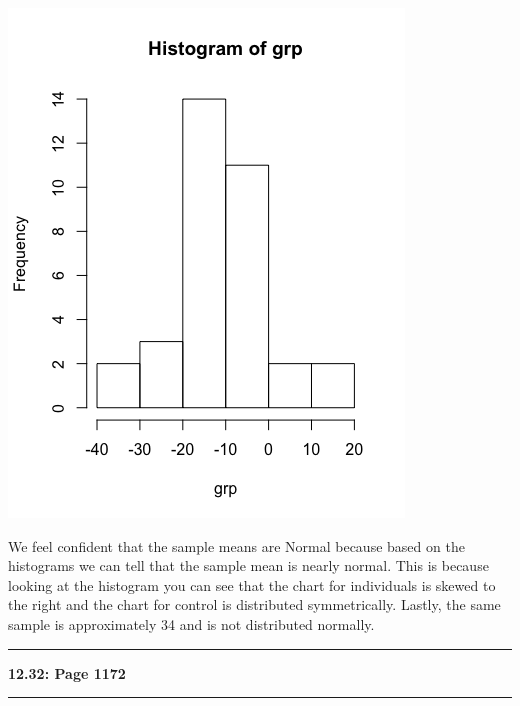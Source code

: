 \documentclass[11pt]{article}
\newcommand\question[2]{\vspace{.25in}\hrule\textbf{#1: #2}\vspace{.5em}\hrule\vspace{.10in}}
\begin{document}
		\includegraphics[scale=0.38]{images/grpHist.png}\par


    We feel confident that the sample means are Normal because based on the histograms we can tell
    that the sample mean is nearly normal. This is because looking at the histogram you can see that 
    the chart for individuals is skewed to the right and the chart for control is distributed symmetrically. 
    Lastly, the same sample is approximately 34 and is not distributed normally.\par
	

\question{12.32}{Page 1172}
\end{document}
